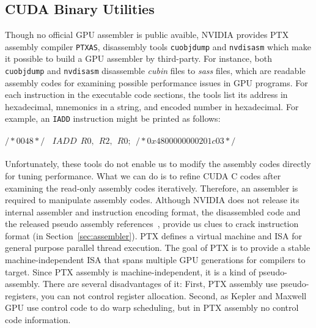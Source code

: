 \subsection{CUDA Binary Utilities}
\label{sec:cuda}
Though no official GPU assembler is public avaible, NVIDIA provides PTX assembly compiler {\tt PTXAS}, disassembly tools {\tt cuobjdump} and {\tt nvdisasm} which make it possible to build a GPU assembler by third-party.
For instance, both {\tt cuobjdump} and {\tt nvdisasm} disassemble {\em cubin} files to {\em sass} files, which are 
readable assembly codes for examining possible performance issues in GPU programs. For each instruction in the 
executable code sections, the tools list its address in hexadecimal, mnemonics in a string, and encoded number in 
hexadecimal. For example, an {\tt IADD} instruction might be printed as follows: \\\\
$/*0048*/~~~~IADD~~R0,~~R2,~~R0;~~/* 0x4800000000201c03 */$\\\\
Unfortunately, these tools do not enable us to modify the assembly codes directly for tuning performance. What we can 
do is to refine CUDA C codes after examining the read-only assembly codes iteratively. Therefore, an assembler is 
required to manipulate assembly codes. Although NVIDIA does not release its internal assembler and instruction encoding 
format, the disassembled code and the released pseudo assembly references~\cite{ptx2015isa}, provide us clues to crack 
instruction format (in Section~\ref{sec:assembler}).
PTX defines a virtual machine and ISA for general purpose parallel thread execution.
The goal of PTX is to provide a stable machine-independent
ISA that spans multiple GPU generations for compilers to target.
Since PTX assembly is machine-independent, it is a kind of pseudo-assembly. There are several disadvantages of it:
First, PTX assembly use pseudo-registers, you can not control register
allocation. Second, as Kepler and Maxwell GPU use control code to do warp
scheduling, but in PTX assembly no control code information.
